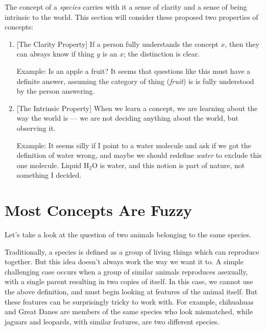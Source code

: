\documentclass[9pt, twoside]{book}
\theoremstyle{argtstyle}
\begin{document}
The concept of a {\em species} carries with it a sense of clarity and a
sense of being intrinsic to the world.
This section will consider
these proposed two properties of concepts:
\begin{enumerate}
    \item{} [The Clarity Property]
        If a person fully understands the concept $x$,
        then they can always know if thing $y$ is an $x$;
        the distinction is clear.

        Example: Is an apple a fruit? It seems that questions like this must
        have a definite answer, assuming the category of thing ({\em fruit}) is
        is fully understood by the person answering.
    \item{} [The Intrinsic Property]
        When we learn a concept, we are learning about the way the world
        is --- we are not deciding anything about the world, but observing it.

        Example: It seems silly if I point to a water molecule and ask if we got
        the definition of water wrong, and maybe we should redefine {\em water}
        to exclude this one molecule.
        Liquid H$_2$O is water, and this notion is part
        of nature, not something I decided.
\end{enumerate}


\section{Most Concepts Are Fuzzy}

Let's take a look at the question of two animals belonging to the
same species.

Traditionally, a species is defined as a group of living things
which can reproduce together. But this idea doesn't always work the way we want
it to. A simple challenging case occurs when a group of similar animals
reproduces asexually, with a single parent resulting in two copies of itself. In
this case, we cannot use the above definition, and must begin looking at
features of the animal itself. But these features can be surprisingly
tricky to work with. For example, chihuahuas and Great Danes are members of the same
species who look mismatched, while jaguars and leopards, with similar
features, are two different species.
\end{document}
